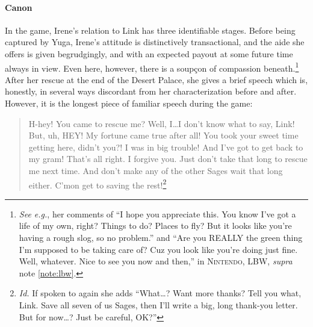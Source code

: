  \paragraph{Canon}
  In the game, Irene's relation to Link has three identifiable stages. Before being captured by Yuga, Irene's attitude is distinctively transactional, and the aide she offers is given begrudgingly, and with an expected payout at some future time always in view. Even here, however, there is a soupçon of compassion beneath.\footnote{\label{note:nicegruff}\textit{See e.g.}, her comments of ``I hope you appreciate this. You know I’ve got a life of my own, right? Things to do? Places to fly? But it looks like you’re having a rough slog, so no problem.'' and ``Are you REALLY the green thing I’m supposed to be taking care of? Cuz you look like you’re doing just fine. Well, whatever. Nice to see you now and then,'' in \textsc{Nintendo, LBW}, \textit{supra} note \ref{note:lbw}.}  After her rescue at the end of the Desert Palace, she gives a brief speech which is, honestly, in several ways discordant from her characterization before and after. However, it is the longest piece of familiar speech during the game:\begin{quote}
  H-hey! You came to rescue me? Well, I\ldots I don’t know what to say, Link! But, uh, HEY! My fortune came true after all! You took your sweet time getting here, didn’t you?! I was in big trouble! And I’ve got to get back to my gram! That’s all right. I forgive you. Just don’t take that long to rescue me next time. And don’t make any of the other Sages wait that long either. C’mon get to saving the rest!\footnote{\textit{Id.} If spoken to again she adds ``What\ldots{}? Want more thanks? Tell you what, Link. Save all seven of us Sages, then I’ll write a big, long thank-you letter. But for now\ldots{}? Just be careful, OK?''}
  \end{quote}
